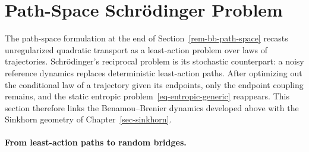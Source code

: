
\section{Path-Space Schr\"odinger Problem}
\label{sec-path-space-schrodinger}

The path-space formulation at the end of Section~\ref{rem-bb-path-space} recasts unregularized quadratic transport as a least-action problem over laws of trajectories. Schr\"odinger's reciprocal problem is its stochastic counterpart: a noisy reference dynamics replaces deterministic least-action paths. After optimizing out the conditional law of a trajectory given its endpoints, only the endpoint coupling remains, and the static entropic problem~\eqref{eq-entropic-generic} reappears. This section therefore links the Benamou--Brenier dynamics developed above with the Sinkhorn geometry of Chapter~\ref{sec-sinkhorn}.

\paragraph{From least-action paths to random bridges.}

